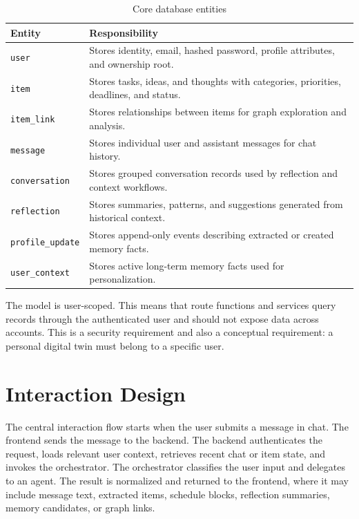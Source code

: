 \begin{table}[H]
\centering
\caption{Core database entities}
\label{tab:db-entities}
\begin{tabular}{|p{}|p{}|}
\hline
\textbf{Entity} & \textbf{Responsibility}\\
\hline
\texttt{user} & Stores identity, email, hashed password, profile attributes, and ownership root.\\
\hline
\texttt{item} & Stores tasks, ideas, and thoughts with categories, priorities, deadlines, and status.\\
\hline
\texttt{item\_link} & Stores relationships between items for graph exploration and analysis.\\
\hline
\texttt{message} & Stores individual user and assistant messages for chat history.\\
\hline
\texttt{conversation} & Stores grouped conversation records used by reflection and context workflows.\\
\hline
\texttt{reflection} & Stores summaries, patterns, and suggestions generated from historical context.\\
\hline
\texttt{profile\_update} & Stores append-only events describing extracted or created memory facts.\\
\hline
\texttt{user\_context} & Stores active long-term memory facts used for personalization.\\
\hline
\end{tabular}
\end{table}

The model is user-scoped. This means that route functions and services query records through the authenticated user and should not expose data across accounts. This is a security requirement and also a conceptual requirement: a personal digital twin must belong to a specific user.

\section{Interaction Design}

The central interaction flow starts when the user submits a message in chat. The frontend sends the message to the backend. The backend authenticates the request, loads relevant user context, retrieves recent chat or item state, and invokes the orchestrator. The orchestrator classifies the user input and delegates to an agent. The result is normalized and returned to the frontend, where it may include message text, extracted items, schedule blocks, reflection summaries, memory candidates, or graph links.

